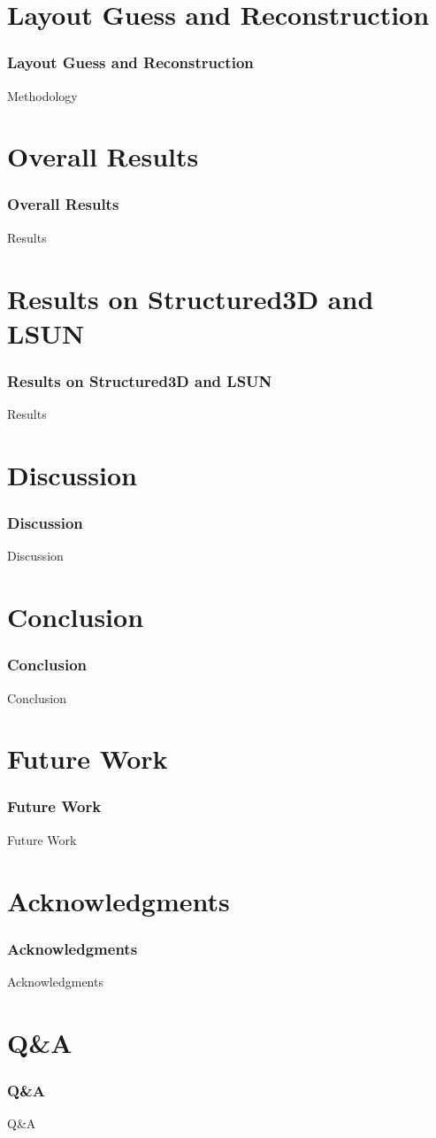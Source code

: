 \documentclass{beamer}
\begin{document}
\section{Layout Guess and Reconstruction}
\begin{frame}
\frametitle{Layout Guess and Reconstruction}
Methodology
\end{frame}

\section{Overall Results}
\begin{frame}
\frametitle{Overall Results}
Results
\end{frame}

\section{Results on Structured3D and LSUN}
\begin{frame}
\frametitle{Results on Structured3D and LSUN}
Results
\end{frame}

\section{Discussion}
\begin{frame}
\frametitle{Discussion}
Discussion
\end{frame}

\section{Conclusion}
\begin{frame}
\frametitle{Conclusion}
Conclusion
\end{frame}

\section{Future Work}
\begin{frame}
\frametitle{Future Work}
Future Work
\end{frame}

\section{Acknowledgments}
\begin{frame}
\frametitle{Acknowledgments}
Acknowledgments
\end{frame}

\section{Q\&A}
\begin{frame}
\frametitle{Q\&A}
Q\&A
\end{frame}
\end{document}
